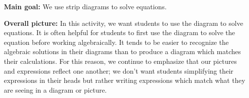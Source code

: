 \documentclass[nooutcomes,noauthor]{ximera}
\begin{document}
\begin{instructorNotes} 



{\bf Main goal:} We use strip diagrams to solve equations.


{\bf Overall picture:} In this activity, we want students to use the diagram to solve equations. It is often helpful for students to first use the diagram to solve the equation before working algebraically. It tends to be easier to recognize the algebraic solutions in their diagrams than to produce a diagram which matches their calculations. For this reason, we continue to emphasize that our pictures and expressions reflect one another; we don't want students simplifying their expressions in their heads but rather writing expressions which match what they are seeing in a diagram or picture.





\end{instructorNotes}
\end{document}
